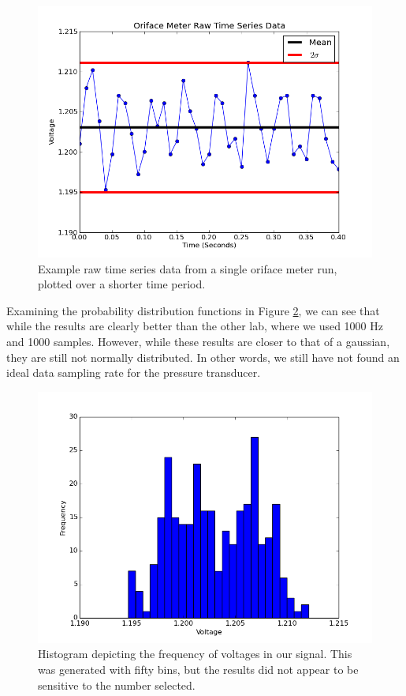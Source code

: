 \documentclass{article}
\begin{document}
\begin{figure}[!htb]
  \begin{center}
    \includegraphics[width = 12 cm]{figs/oriface_time_04.png}
    \caption{Example raw time series data from a single oriface meter 
      run, plotted over a shorter time period.}
    \label{oriface-time-4}
  \end{center}
\end{figure}


Examining the probability distribution functions in Figure \ref{oriface-hist},
we can see that while the results are clearly better than the other lab, where we used 1000 Hz and 1000 samples. 
However, while these results are closer to that of a gaussian, 
they are still not normally distributed. In other words, we still have not found an ideal data sampling rate 
for the pressure transducer.  

  \begin{figure}[!htb]
   \begin{center}
    \includegraphics[width = 12 cm]{figs/oriface_hist.png}
    \caption{Histogram depicting the frequency of voltages in our
    signal. This was generated with fifty bins, but the results did not
    appear to be sensitive to the number selected.}
    \label{oriface-hist}
   \end{center}
  \end{figure}
\end{document}

